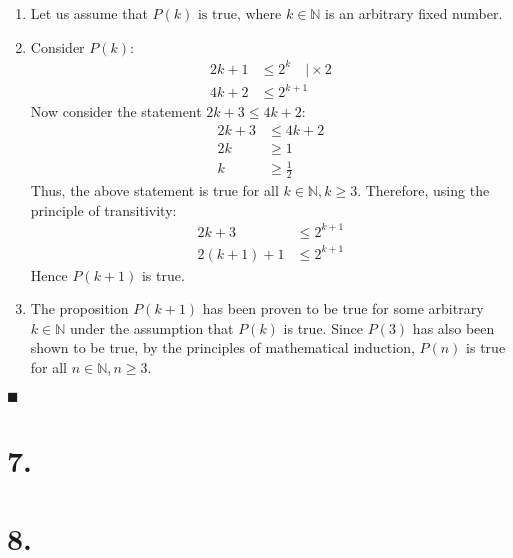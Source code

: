 \documentclass[12pt]{article}
\newcommand{\q}{\hfill $\blacksquare$}
\newenvironment{ps}
{\begin{enumerate}[leftmargin=0em, itemindent=1.5em]}
{\end{enumerate}}
\begin{document}
\begin{ps}
\begin{enumerate}[label=\arabic*.]
    \item Let us assume that \( P(k) \text{ is true, where } k \in \mathbb{N} \) is an arbitrary
        fixed number.

    \item Consider \( P(k) \):
    \begin{align*}
        2k + 1 &\leq 2^k \quad \biggr| \times 2 \\
        4k + 2 &\leq 2^{k+1}
    \end{align*}
    Now consider the statement \( 2k+3 \leq 4k + 2 \):
    \begin{align*}
        2k + 3 &\leq 4k + 2 \\
        2k &\geq 1 \\
        k &\geq \frac{1}{2}
    \end{align*}
    Thus, the above statement is true for all \( k \in \mathbb{N}, k \geq 3 \).
    Therefore, using the principle of transitivity:
    \begin{align*}
        2k+3 &\leq 2^{k+1} \\
        2(k+1) + 1 &\leq 2^{k+1}
    \end{align*}
    Hence \( P(k+1) \) is true.

    \item The proposition \( P(k+1) \) has been proven to be true for some arbitrary \( k \in
        \mathbb{N} \) under the assumption that \( P(k) \) is true. Since \( P(3) \) has also been
        shown to be true, by the principles of mathematical induction, \( P(n) \) is true for all \( n \in
        \mathbb{N}, n \geq 3 \).

    \end{enumerate} \q

\end{ps}

\section*{7.}
\section*{8.}
\end{document}
